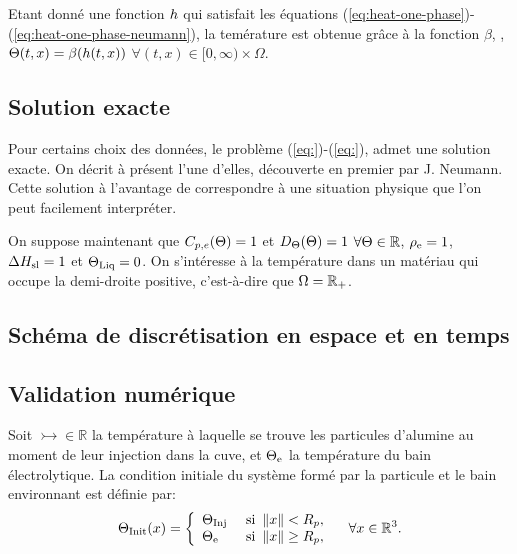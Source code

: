 Etant donné une fonction $h$ qui satisfait les
équations
(\ref{eq:heat-one-phase})-(\ref{eq:heat-one-phase-neumann}), la
temérature est obtenue grâce à la fonction $\beta$, \ie,
$\Theta(t, x) = \beta(h(t, x))$ $\forall (t, x)
\in [0,\infty)\times\Omega$.


\subsection*{Solution exacte}
Pour certains choix des données, le problème (\ref{eq:})-(\ref{eq:}),
admet une solution exacte. On décrit à présent l'une d'elles,
découverte en premier par J. Neumann. Cette solution à l'avantage de
correspondre à une situation physique que l'on peut facilement
interpréter.

On suppose maintenant que $C_{p,e}(\Theta) =
1$ et $D_\Theta(\Theta)=1$ $\forall\Theta \in
\mathbb R$, $\rho_\mathrm{e} = 1$, $\Delta H_\mathrm{sl} = 1$ et $\Theta_\text{Liq}
= 0$. On s'intéresse à la température dans un matériau qui
occupe la demi-droite positive, c'est-à-dire que $\Omega = \mathbb R_+$.

\subsection*{Schéma de discrétisation en espace et en temps}

\subsection*{Validation numérique}



Soit $\tinj\in\mathbb R$ la température à laquelle se trouve les
particules d'alumine au moment de leur injection dans la cuve, et
$\Theta_\mathrm{e}$ la température du bain électrolytique. La condition
initiale du système formé par la particule et le bain environnant est
définie par:
\begin{equation}
  \Theta_\text{Init}(x) = \left\{
  \begin{array}{ll}
    \Theta_\text{Inj} & \text{ si } \left\lVert x \right\rVert < R_p,\\
    \Theta_\mathrm{e} & \text{ si } \left\lVert x \right\rVert \geq R_p,\\
  \end{array}
  \right.\quad \forall x\in\mathbb R^3.\label{eq:initial-temperature}
\end{equation}

